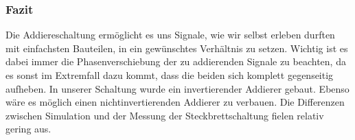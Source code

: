\subsubsection{Fazit}
Die Addiereschaltung ermöglicht es uns Signale, wie wir selbst erleben durften mit einfachsten Bauteilen, in ein gewünschtes Verhältnis zu setzen. Wichtig ist es dabei immer die Phasenverschiebung der zu addierenden Signale zu beachten, da es sonst im Extremfall dazu kommt, dass die beiden sich komplett gegenseitig aufheben. In unserer Schaltung wurde ein invertierender Addierer gebaut. Ebenso wäre es möglich einen nichtinvertierenden Addierer zu verbauen. Die Differenzen zwischen Simulation und der Messung der Steckbrettschaltung fielen relativ gering aus.



